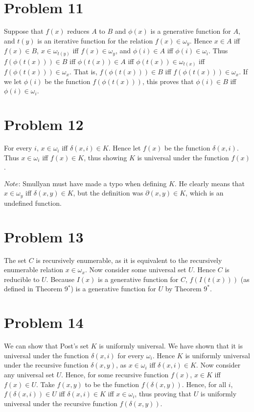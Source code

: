 \documentclass{article}
\theoremstyle{definition}
\begin{document}
\section*{Problem 11}
Suppose that $f(x)$ reduces $A$ to $B$ and $\phi(x)$ is a generative function for $A$, and $t(y)$ is an iterative function for the relation $f(x)\in\omega_y$. Hence 
$x\in A$ iff $f(x)\in B$, $x\in\omega_{t(y)}$ iff $f(x)\in\omega_{y}$, and $\phi(i)\in A$ iff $\phi(i)\in\omega_i$. Thus $f(\phi(t(x)))\in B$ iff $\phi(t(x))\in A$ iff $\phi(t(x))\in\omega_{t(x)}$
iff $f(\phi(t(x)))\in\omega_x$. That is, $f(\phi(t(x)))\in B$ iff $f(\phi(t(x)))\in\omega_x$. If we let $\phi(i)$ be the function $f(\phi(t(x)))$, this proves that 
$\phi(i)\in B$ iff $\phi(i)\in\omega_i$.

\section*{Problem 12}
For every $i$, $x\in\omega_i$ iff $\delta(x,i)\in K$. Hence let $f(x)$ be the function $\delta(x,i)$. Thus $x\in\omega_i$ iff $f(x)\in K$, thus showing $K$ is universal under the function 
$f(x)$.


$Note$: Smullyan must have made a typo when defining $K$. He clearly means that $x\in\omega_y$ iff $\delta(x,y)\in K$, but the definition was $\partial(x,y)\in K$, which is an undefined 
function.

\section*{Problem 13}
The set $C$ is recursively enumerable, as it is equivalent to the recursively enumerable relation $x\in\omega_x$. Now consider some universal set $U$. Hence $C$ is reducible to $U$. Because $I(x)$ is a generative function 
for $C$, $f(I(t(x)))$ (as defined in Theorem 9$^*$) is a generative function for $U$ by Theorem $9^*$. 

\section*{Problem 14}
We can show that Post's set $K$ is uniformly universal. We have shown that it is universal under the function $\delta(x,i)$ for every $\omega_i$. Hence $K$ is uniformly universal under the 
recursive function $\delta(x,y)$, as $x\in\omega_i$ iff $\delta(x,i)\in K$. Now consider any universal set $U$. Hence, for some recursive function $f(x)$, 
$x\in K$ iff $f(x)\in U$. Take $f(x,y)$ to be the function $f(\delta(x,y))$. Hence, for all $i$, $f(\delta(x,i))\in U$ iff $\delta(x,i)\in K$ iff $x\in\omega_i$, thus proving that 
$U$ is uniformly universal under the recursive function $f(\delta(x,y))$.
\end{document}
